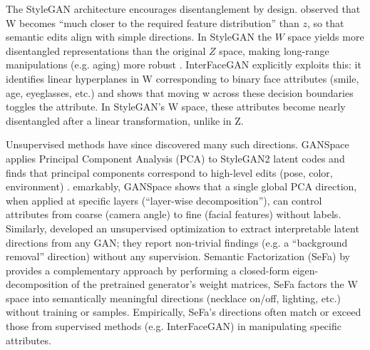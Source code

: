 The StyleGAN architecture encourages disentanglement by design. 
\citet{karras2020analyzingimprovingimagequality} observed that W becomes “much closer to the required feature distribution” than $z$, 
so that semantic edits align with simple directions.
In StyleGAN the $W$ space yields more disentangled representations than the original $Z$ space, making long-range manipulations (e.g. aging) more robust \citep{shen2020interpretinglatentspacegans}.
InterFaceGAN explicitly exploits this: it identifies linear hyperplanes in W corresponding 
to binary face attributes (smile, age, eyeglasses, etc.) and shows that moving w across these decision boundaries toggles the attribute.
In StyleGAN's W space, these attributes become nearly disentangled after a linear transformation, unlike in Z.

Unsupervised methods have since discovered many such directions.
GAN\-Space applies Principal Component Analysis (PCA) to StyleGAN2 latent codes and finds that principal components correspond
to high-level edits (pose, color, environment) \citep{harkonen2020ganspacediscoveringinterpretablegan}.
emarkably, GANSpace shows that a single global PCA direction, when applied at specific layers (“layer-wise decomposition”), 
can control attributes from coarse (camera angle) to fine (facial features) without labels.
Similarly, \citet{voynov2020unsuperviseddiscoveryinterpretabledirections} developed an unsupervised optimization to 
extract interpretable latent directions from any GAN; they report non-trivial findings (e.g. a “background removal” direction) 
without any supervision.
Semantic Factorization (SeFa) by \citet{shen2021closedformfactorizationlatentsemantics} provides a complementary approach 
by performing a closed-form eigen-decomposition of the pretrained generator's weight matrices, 
SeFa factors the W space into semantically meaningful directions (necklace on/off, lighting, etc.) without training or samples.
Empirically, SeFa's directions often match or exceed those from supervised methods (e.g. InterFaceGAN) in manipulating specific attributes.


